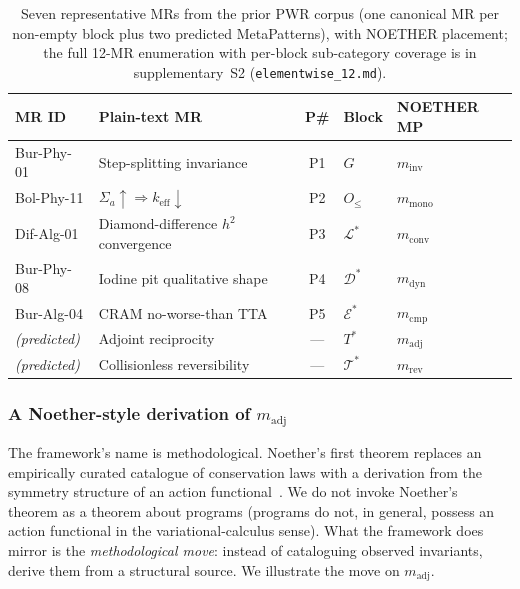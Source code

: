 \documentclass[acmsmall, screen]{acmart}
\begin{document}
\begin{table}[h]
\centering
\caption{Seven representative MRs from the prior PWR corpus (one canonical MR per non-empty block plus two predicted MetaPatterns), with NOETHER placement; the full 12-MR enumeration with per-block sub-category coverage is in supplementary~S2 (\texttt{elementwise\_12.md}).}
\label{tab:elementwise}
\footnotesize
\begin{tabular}{llcll}
\toprule
\textbf{MR ID} & \textbf{Plain-text MR} & \textbf{P\#} & \textbf{Block} & \textbf{NOETHER MP} \\
\midrule
Bur-Phy-01 & Step-splitting invariance & P1 & $G$ & $m_{\mathrm{inv}}$ \\
Bol-Phy-11 & $\Sigma_a\!\uparrow \Rightarrow k_{\mathrm{eff}}\!\downarrow$ & P2 & $O_{\le}$ & $m_{\mathrm{mono}}$ \\
Dif-Alg-01 & Diamond-difference $h^2$ convergence & P3 & $\mathcal{L}^{*}$ & $m_{\mathrm{conv}}$ \\
Bur-Phy-08 & Iodine pit qualitative shape & P4 & $\mathcal{D}^{*}$ & $m_{\mathrm{dyn}}$ \\
Bur-Alg-04 & CRAM no-worse-than TTA & P5 & $\mathcal{E}^{*}$ & $m_{\mathrm{cmp}}$ \\
\textit{(predicted)} & Adjoint reciprocity & --- & $T^{*}$ & $m_{\mathrm{adj}}$ \\
\textit{(predicted)} & Collisionless reversibility & --- & $\mathcal{T}^{*}$ & $m_{\mathrm{rev}}$ \\
\bottomrule
\end{tabular}
\end{table}

\subsubsection{A Noether-style derivation of \texorpdfstring{$m_{\mathrm{adj}}$}{m\_adj}}
\label{subsec:noether-mAdj}

The framework's name is methodological. Noether's first theorem replaces an empirically curated catalogue of conservation laws with a derivation from the symmetry structure of an action functional~\cite{Noether1918}. We do not invoke Noether's theorem as a theorem about programs (programs do not, in general, possess an action functional in the variational-calculus sense). What the framework does mirror is the \emph{methodological move}: instead of cataloguing observed invariants, derive them from a structural source. We illustrate the move on $m_{\mathrm{adj}}$.
\end{document}
